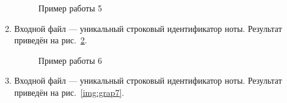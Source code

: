 \documentclass[12pt, a4paper]{article}
\begin{document}
\begin{enumerate}
\begin{figure}[h]
  		\caption{Пример работы 5}
  		\label{img:grap5}
	\end{figure}
	\newpage
	\item Входной файл --- уникальный строковый идентификатор ноты.
	Результат приведён на рис.~\ref{img:grap6}.
	\begin{figure}[h]
  		\caption{Пример работы 6}
  		\label{img:grap6}
	\end{figure}
	\newpage
	\item Входной файл --- уникальный строковый идентификатор ноты.
	Результат приведён на рис.~\ref{img:grap7}.
	\begin{figure}[h]

\end{figure}
\end{enumerate}
\end{document}
